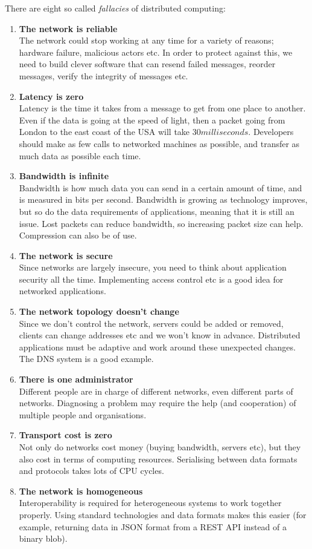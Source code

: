 There are eight so called \textit{fallacies} of distributed computing:

\begin{enumerate}
  \item \textbf{The network is reliable}\\
    The network could stop working at any time for a variety of reasons;
    hardware failure, malicious actors etc. In order to protect against this, we
    need to build clever software that can resend failed messages, reorder
    messages, verify the integrity of messages etc.
  \item \textbf{Latency is zero}\\
    Latency is the time it takes from a message to get from one place to
    another. Even if the data is going at the speed of light, then a packet
    going from London to the east coast of the USA will take $30 milliseconds$.
    Developers should make as few calls to networked machines as possible, and
    transfer as much data as possible each time.
  \item \textbf{Bandwidth is infinite}\\
    Bandwidth is how much data you can send in a certain amount of time, and is
    measured in bits per second. Bandwidth is growing as technology improves,
    but so do the data requirements of applications, meaning that it is still an
    issue. Lost packets can reduce bandwidth, so increasing packet size can
    help. Compression can also be of use.
  \item \textbf{The network is secure}\\
    Since networks are largely insecure, you need to think about application
    security all the time. Implementing access control etc is a good idea for
    networked applications.
  \item \textbf{The network topology doesn't change}\\
    Since we don't control the network, servers could be added or removed,
    clients can change addresses etc and we won't know in advance. Distributed
    applications must be adaptive and work around these unexpected changes. The
    DNS system is a good example.
  \item \textbf{There is one administrator}\\
    Different people are in charge of different networks, even different parts 
    of networks. Diagnosing a problem may require the help (and cooperation) of
    multiple people and organisations.
  \item \textbf{Transport cost is zero}\\
    Not only do networks cost money (buying bandwidth, servers etc), but they
    also cost in terms of computing resources. Serialising between data formats
    and protocols takes lots of CPU cycles.
  \item \textbf{The network is homogeneous}\\
    Interoperability is required for heterogeneous systems to work together
    properly. Using standard technologies and data formats makes this easier
    (for example, returning data in JSON format from a REST API instead of a
    binary blob).
\end{enumerate}

